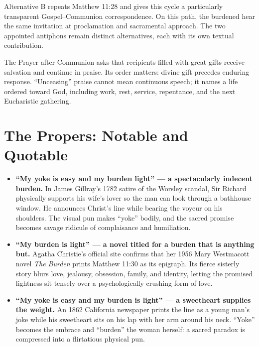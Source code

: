 Alternative B repeats Matthew 11:28 and gives this cycle a particularly transparent Gospel--Communion correspondence. On this path, the burdened hear the same invitation at proclamation and sacramental approach. The two appointed antiphons remain distinct alternatives, each with its own textual contribution.

The Prayer after Communion asks that recipients filled with great gifts receive salvation and continue in praise. Its order matters: divine gift precedes enduring response. “Unceasing” praise cannot mean continuous speech; it names a life ordered toward God, including work, rest, service, repentance, and the next Eucharistic gathering.

\section*{The Propers: Notable and Quotable}

{\small
\begin{itemize}
\item \textbf{“My yoke is easy and my burden light” --- a spectacularly indecent burden.\enspace{}} In James Gillray's 1782 satire of the Worsley scandal, Sir Richard physically supports his wife's lover so the man can look through a bathhouse window. He announces Christ's line while bearing the voyeur on his shoulders. The visual pun makes “yoke” bodily, and the sacred promise becomes savage ridicule of complaisance and humiliation.

\item \textbf{“My burden is light” --- a novel titled for a burden that is anything but.\enspace{}} Agatha Christie's official site confirms that her 1956 Mary Westmacott novel \emph{The Burden} prints Matthew 11:30 as its epigraph. Its fierce sisterly story blurs love, jealousy, obsession, family, and identity, letting the promised lightness sit tensely over a psychologically crushing form of love.

\item \textbf{“My yoke is easy and my burden is light” --- a sweetheart supplies the weight.\enspace{}} An 1862 California newspaper prints the line as a young man's joke while his sweetheart sits on his lap with her arm around his neck. “Yoke” becomes the embrace and “burden” the woman herself: a sacred paradox is compressed into a flirtatious physical pun.
\end{itemize}
}

